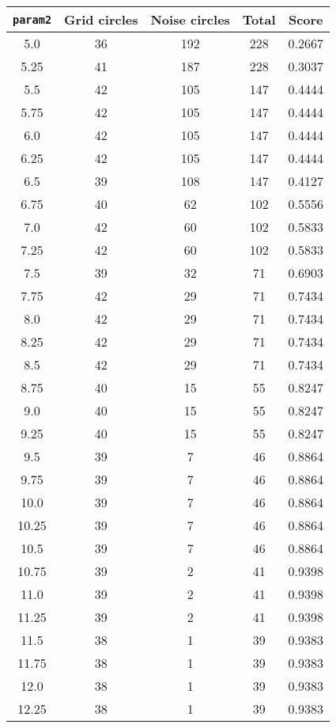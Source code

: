 \documentclass[letterpaper, 12pt]{article}
\begin{document}
\begin{longtable}{|c|c|c|c|c|}
\hline
\textbf{\texttt{param2}} & \textbf{Grid circles} & \textbf{Noise circles} & \textbf{Total} & \textbf{Score} \\
\hline
5.0 & 36 & 192 & 228 & 0.2667 \\
\hline
5.25 & 41 & 187 & 228 & 0.3037 \\
\hline
5.5 & 42 & 105 & 147 & 0.4444 \\
\hline
5.75 & 42 & 105 & 147 & 0.4444 \\
\hline
6.0 & 42 & 105 & 147 & 0.4444 \\
\hline
6.25 & 42 & 105 & 147 & 0.4444 \\
\hline
6.5 & 39 & 108 & 147 & 0.4127 \\
\hline
6.75 & 40 & 62 & 102 & 0.5556 \\
\hline
7.0 & 42 & 60 & 102 & 0.5833 \\
\hline
7.25 & 42 & 60 & 102 & 0.5833 \\
\hline
7.5 & 39 & 32 & 71 & 0.6903 \\
\hline
7.75 & 42 & 29 & 71 & 0.7434 \\
\hline
8.0 & 42 & 29 & 71 & 0.7434 \\
\hline
8.25 & 42 & 29 & 71 & 0.7434 \\
\hline
8.5 & 42 & 29 & 71 & 0.7434 \\
\hline
8.75 & 40 & 15 & 55 & 0.8247 \\
\hline
9.0 & 40 & 15 & 55 & 0.8247 \\
\hline
9.25 & 40 & 15 & 55 & 0.8247 \\
\hline
9.5 & 39 & 7 & 46 & 0.8864 \\
\hline
9.75 & 39 & 7 & 46 & 0.8864 \\
\hline
10.0 & 39 & 7 & 46 & 0.8864 \\
\hline
10.25 & 39 & 7 & 46 & 0.8864 \\
\hline
10.5 & 39 & 7 & 46 & 0.8864 \\
\hline
10.75 & 39 & 2 & 41 & 0.9398 \\
\hline
11.0 & 39 & 2 & 41 & 0.9398 \\
\hline
11.25 & 39 & 2 & 41 & 0.9398 \\
\hline
11.5 & 38 & 1 & 39 & 0.9383 \\
\hline
11.75 & 38 & 1 & 39 & 0.9383 \\
\hline
12.0 & 38 & 1 & 39 & 0.9383 \\
\hline
12.25 & 38 & 1 & 39 & 0.9383 \\
\hline

\end{longtable}
\end{document}
